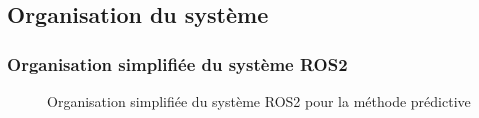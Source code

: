 \subsection{Organisation du système}
\begin{frame}
    \frametitle{Organisation simplifiée du système ROS2}
    \begin{figure}
        \centering
        \resizebox{0.5\textwidth}{!}{%
        }
        \caption{Organisation simplifiée du système ROS2 pour la méthode prédictive}
        \label{fig:ros2_system}
    \end{figure}
\end{frame}
